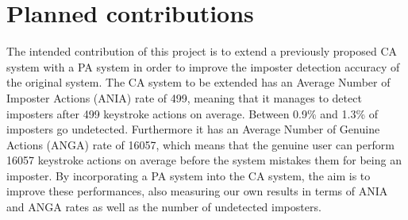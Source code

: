 \documentclass[informationsecurity]{gucmasterproject}
\begin{document}
%

\section{Planned contributions}
The intended contribution of this project is to extend a previously proposed CA system with a PA system in order to improve the imposter detection accuracy of the original system.
The CA system to be extended \cite{mondal} has an Average Number of Imposter Actions (ANIA) rate of 499, meaning that it manages to detect imposters after 499 keystroke actions on average. 
Between 0.9\% and 1.3\% of imposters go undetected.
Furthermore it has an Average Number of Genuine Actions (ANGA) rate of 16057, which means that the genuine user can perform 16057 keystroke actions on average before the system mistakes them for being an imposter.
By incorporating a PA system into the CA system, the aim is to improve these performances, also measuring our own results in terms of ANIA and ANGA rates as well as the number of undetected imposters.
\end{document}
